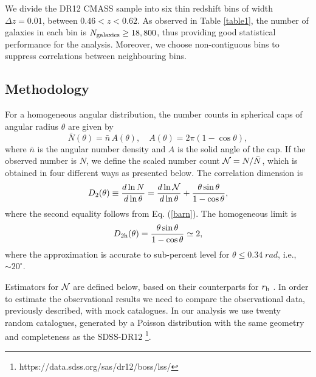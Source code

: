 \documentclass[useAMS,usenatbib]{mn2e}
\def \be {\begin{equation}}
\def \ee {\end{equation}}
\begin{document}
We divide the DR12 CMASS sample into six thin redshift bins of width $\Delta z = 0.01$, between $0.46 < z < 0.62$. As observed in Table \ref{table1}, the number of galaxies in each bin is $N_{\rm galaxies} \geq 18,800$, thus providing good statistical performance for the analysis. 
Moreover, we choose non-contiguous bins to suppress correlations between neighbouring bins. 

\subsection{Methodology}

For a homogeneous angular distribution, the number counts in spherical caps of angular radius $\theta$ are given by
\be\label{barn}
\bar N(\theta)=\bar n \, A(\theta), \quad A(\theta)=2\pi(1-\cos\theta),
\ee
where $\bar n$ is the angular number density and $A$ is the solid angle of the cap. 
If the observed number is $N$, we define the scaled number count ${\cal N}=N/\bar N$, which  is 
obtained in four different ways as presented below. The correlation dimension is
\begin{equation}
\label{defD2}
D_2(\theta) \equiv {d\ln N \over d\ln\theta}= {d\ln {\cal N} \over d\ln \theta} + {\theta\sin\theta \over 1-\cos\theta} ,
\end{equation}
where the second equality follows from Eq. (\ref{barn}). The homogeneous limit is 
\be\label{d2h}
D_{2{\rm h}}(\theta)= {\theta\sin\theta \over 1-\cos\theta}\simeq 2,
\ee 
where the approximation is accurate to sub-percent level for $\theta \leqslant 0.34 \; rad$, i.e., $\sim 20^\circ$.

Estimators for ${\cal N}$ are defined below, based on their counterparts for $r_{\rm h}$ \citep{alonso15,laurent16,ntelis17}. In order to estimate the observational results we need to compare the observational data, previously described, with mock catalogues. In our analysis we use twenty random catalogues, generated by a Poisson distribution with the same geometry and completeness as the SDSS-DR12 {\footnote{https://data.sdss.org/sas/dr12/boss/lss/}}. \\
\end{document}
